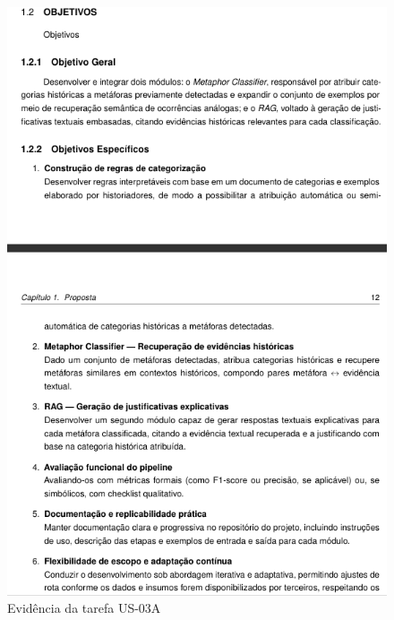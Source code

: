 \begin{figure}[htbp]
  \centering
  \includegraphics[width=0.6\linewidth]{pictures/problema_objetivos.png}
  \caption{Evidência da tarefa US-03A}
\end{figure}
